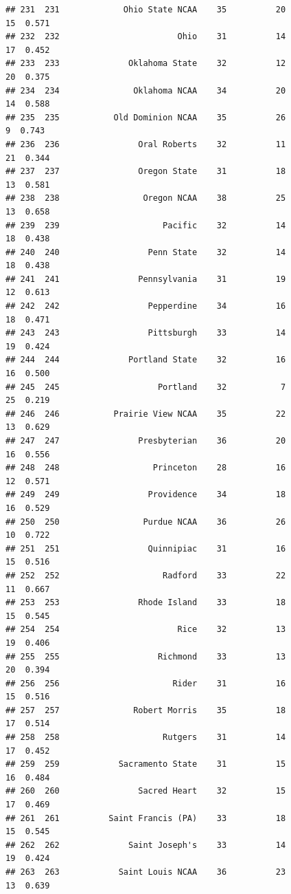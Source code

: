 \documentclass[]{book}
\begin{document}
\begin{verbatim}
## 231  231             Ohio State NCAA    35          20            15  0.571
## 232  232                        Ohio    31          14            17  0.452
## 233  233              Oklahoma State    32          12            20  0.375
## 234  234               Oklahoma NCAA    34          20            14  0.588
## 235  235           Old Dominion NCAA    35          26             9  0.743
## 236  236                Oral Roberts    32          11            21  0.344
## 237  237                Oregon State    31          18            13  0.581
## 238  238                 Oregon NCAA    38          25            13  0.658
## 239  239                     Pacific    32          14            18  0.438
## 240  240                  Penn State    32          14            18  0.438
## 241  241                Pennsylvania    31          19            12  0.613
## 242  242                  Pepperdine    34          16            18  0.471
## 243  243                  Pittsburgh    33          14            19  0.424
## 244  244              Portland State    32          16            16  0.500
## 245  245                    Portland    32           7            25  0.219
## 246  246           Prairie View NCAA    35          22            13  0.629
## 247  247                Presbyterian    36          20            16  0.556
## 248  248                   Princeton    28          16            12  0.571
## 249  249                  Providence    34          18            16  0.529
## 250  250                 Purdue NCAA    36          26            10  0.722
## 251  251                  Quinnipiac    31          16            15  0.516
## 252  252                     Radford    33          22            11  0.667
## 253  253                Rhode Island    33          18            15  0.545
## 254  254                        Rice    32          13            19  0.406
## 255  255                    Richmond    33          13            20  0.394
## 256  256                       Rider    31          16            15  0.516
## 257  257               Robert Morris    35          18            17  0.514
## 258  258                     Rutgers    31          14            17  0.452
## 259  259            Sacramento State    31          15            16  0.484
## 260  260                Sacred Heart    32          15            17  0.469
## 261  261          Saint Francis (PA)    33          18            15  0.545
## 262  262              Saint Joseph's    33          14            19  0.424
## 263  263            Saint Louis NCAA    36          23            13  0.639

\end{verbatim}
\end{document}
